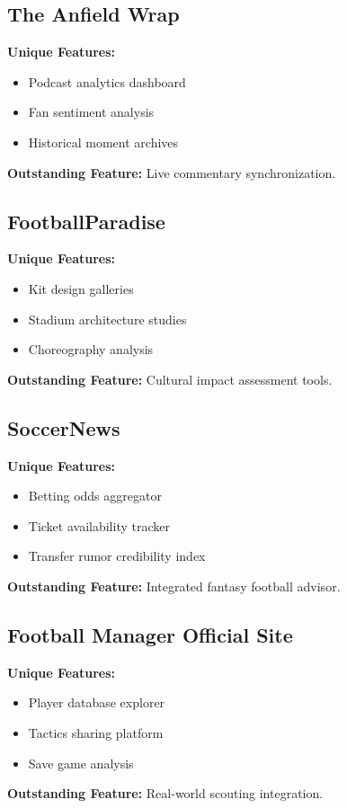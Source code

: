 \subsection{The Anfield Wrap}
\textbf{Unique Features:}
\begin{itemize}
    \item Podcast analytics dashboard
    \item Fan sentiment analysis
    \item Historical moment archives
\end{itemize}
\textbf{Outstanding Feature:} Live commentary synchronization\parencite{anfieldwrap}.

\subsection{FootballParadise}
\textbf{Unique Features:}
\begin{itemize}
    \item Kit design galleries
    \item Stadium architecture studies
    \item Choreography analysis
\end{itemize}
\textbf{Outstanding Feature:} Cultural impact assessment tools\parencite{footballparadise}.

\subsection{SoccerNews}
\textbf{Unique Features:}
\begin{itemize}
    \item Betting odds aggregator
    \item Ticket availability tracker
    \item Transfer rumor credibility index
\end{itemize}
\textbf{Outstanding Feature:} Integrated fantasy football advisor\parencite{soccernews}.

\subsection{Football Manager Official Site}
\textbf{Unique Features:}
\begin{itemize}
    \item Player database explorer
    \item Tactics sharing platform
    \item Save game analysis
\end{itemize}
\textbf{Outstanding Feature:} Real-world scouting integration\parencite{fm}.

